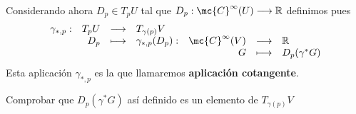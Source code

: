 \begin{defi}
Considerando ahora $D_p \in T_pU$ tal que $D_p: \mc{C}^{\infty}(U) \longrightarrow \mathbb{R}$ definimos pues 
$$\begin{array}{rrclrll}
    \gamma_{*,p} : & T_pU & \longrightarrow & T_{\gamma(p)}V  \\
     & D_p & \longmapsto & \gamma_{*,p}(D_p):&  \mc{C}^{\infty}(V) & \longrightarrow & \mathbb{R} \\
     & & & & G & \longmapsto & D_p(\gamma^*G)
\end{array} $$
Esta aplicación $\gamma_{*,p}$ es la que llamaremos \textbf{aplicación cotangente}.
\end{defi}

\begin{ejer}
Comprobar que $D_p(\gamma^*G)$ así definido es un elemento de $T_{\gamma(p)}V$
\end{ejer}
